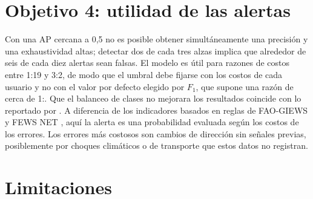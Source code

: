 \section{Objetivo 4: utilidad de las alertas}

Con una AP cercana a 0,5 no es posible obtener simultáneamente una precisión y una exhaustividad altas; detectar dos de cada tres alzas implica que alrededor de seis de cada diez alertas sean falsas. El modelo es útil para razones de costos entre 1:19 y 3:2, de modo que el umbral debe fijarse con los costos de cada usuario y no con el valor por defecto elegido por $F_1$, que supone una razón de cerca de 1:\ccostoe. Que el balanceo de clases no mejorara los resultados coincide con lo reportado por \citet{vandengoorbergh2022}. A diferencia de los indicadores basados en reglas de FAO-GIEWS y FEWS NET \citep{baquedano2015,perakis2018}, aquí la alerta es una probabilidad evaluada según los costos de los errores. Los errores más costosos son cambios de dirección sin señales previas, posiblemente por choques climáticos o de transporte que estos datos no registran.

\section{Limitaciones}

